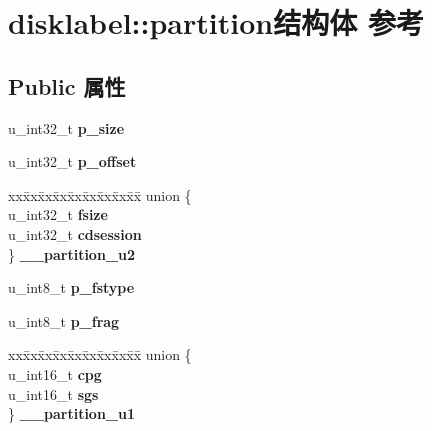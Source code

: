 \hypertarget{structdisklabel_1_1partition}{}\section{disklabel\+:\+:partition结构体 参考}
\label{structdisklabel_1_1partition}
\subsection*{Public 属性}
\begin{DoxyCompactItemize}
\item 
\mbox{\label{structdisklabel_1_1partition_ae0293e270f61dc4bf31d24bee6ff7edc}} 
u\+\_\+int32\+\_\+t {\bfseries p\+\_\+size}
\item 
\mbox{\label{structdisklabel_1_1partition_a128325fd4ce3be28d242a89a62b5754c}} 
u\+\_\+int32\+\_\+t {\bfseries p\+\_\+offset}
\item 
\mbox{\label{structdisklabel_1_1partition_acb294da00408e394d39dfe964bcd63aa}} 
\begin{tabbing}
xx\=xx\=xx\=xx\=xx\=xx\=xx\=xx\=xx\=\kill
union \{\\
\>u\_int32\_t {\bfseries fsize}\\
\>u\_int32\_t {\bfseries cdsession}\\
\} {\bfseries \_\_partition\_u2}\\

\end{tabbing}\item 
\mbox{\label{structdisklabel_1_1partition_af71ce5c3c0e92db793b9ceaeb3a14480}} 
u\+\_\+int8\+\_\+t {\bfseries p\+\_\+fstype}
\item 
\mbox{\label{structdisklabel_1_1partition_a1f345e842f628309e5b79f02f231e084}} 
u\+\_\+int8\+\_\+t {\bfseries p\+\_\+frag}
\item 
\mbox{\label{structdisklabel_1_1partition_a2d8710e62913e98358d933d58c6dafb0}} 
\begin{tabbing}
xx\=xx\=xx\=xx\=xx\=xx\=xx\=xx\=xx\=\kill
union \{\\
\>u\_int16\_t {\bfseries cpg}\\
\>u\_int16\_t {\bfseries sgs}\\
\} {\bfseries \_\_partition\_u1}\\


\end{tabbing}
\end{DoxyCompactItemize}
